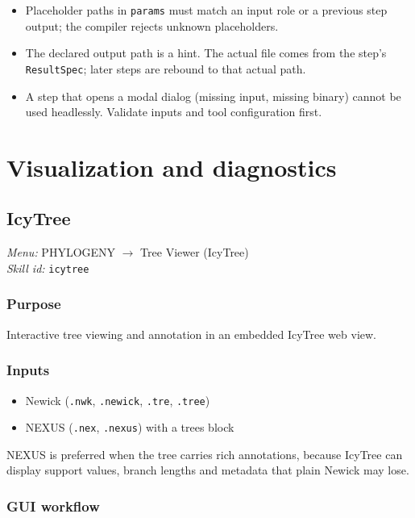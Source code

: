 \documentclass[11pt]{report}
\begin{document}
\begin{itemize}
  \item Placeholder paths in \texttt{params} must match an input role or a previous step output; the compiler rejects unknown placeholders.
  \item The declared output path is a hint. The actual file comes from the step's \texttt{ResultSpec}; later steps are rebound to that actual path.
  \item A step that opens a modal dialog (missing input, missing binary) cannot be used headlessly. Validate inputs and tool configuration first.
\end{itemize}


\chapter{Visualization and diagnostics}
\section{IcyTree}
\noindent\textit{Menu:} PHYLOGENY $\rightarrow$ Tree Viewer (IcyTree)\\
\noindent\textit{Skill id:} \texttt{icytree}

\subsection{Purpose}

Interactive tree viewing and annotation in an embedded IcyTree web view.

\subsection{Inputs}

\begin{itemize}
  \item Newick (\texttt{.\allowbreak nwk}, \texttt{.\allowbreak newick}, \texttt{.\allowbreak tre}, \texttt{.\allowbreak tree})
  \item NEXUS (\texttt{.\allowbreak nex}, \texttt{.\allowbreak nexus}) with a trees block
\end{itemize}

NEXUS is preferred when the tree carries rich annotations, because IcyTree can display support values, branch lengths and metadata that plain Newick may lose.

\subsection{GUI workflow}
\end{document}
